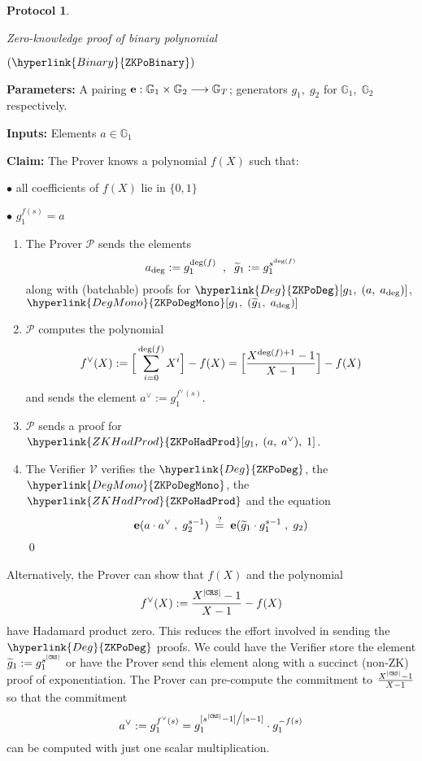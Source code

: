 \documentclass[11pt, lettersize, notitlepage, leqno, footskip=0.6cm]{article}
\newcommand{\lra}{\longrightarrow}
\newcommand{\wti}{\widetilde}
\newcommand{\mc}{\mathcal}
\newcommand{\mb}{\mathbb}
\newcommand{\mbf}{\mathbf}
\newcommand{\mP}{\mc{P}}
\newcommand{\V}{\mc{V}}
\newcommand{\vs}{\vspace{-0.15cm}}
\newcommand{\noin}{\noindent}
\newcommand{\sta}{\stackrel{?}{=}}
\newcommand{\e}{\mbf{e}}
\newtheorem{Prot}[Thm]{Protocol}
\numberwithin{equation}{section}
\begin{document}
\begin{mdframed}
\begin{Prot} \hypertarget{Binary}{Zero-knowledge proof of binary polynomial} $(\hyperlink{Binary}{\tt{ZKPoBinary}})$\end{Prot}  

\noindent \textbf{Parameters:} A pairing ${\bf{e}}:\mb{G}_1\times \mb{G}_2\lra \mb{G}_T$; generators $g_1,\;g_2$ for $\mb{G}_1,\; \mb{G}_2$ respectively.


\noindent \textbf{Inputs:} Elements $a\in \mb{G}_1$

\noindent \textbf{Claim:} The Prover knows a polynomial $f(X)$ such that:

\noin $\bullet$ all coefficients of $f(X)$ lie in $\{0,1\}$

\noin $\bullet$  $g_1^{f(s)} = a$

\begin{enumerate}[wide, labelwidth=!, labelindent=0pt, itemsep=-0.2ex] 

\item The Prover $\mP$ sends the elements \vs $$a_{\deg}:= g_1^{{\deg(f)}}\;\;,\;\; \wti{g}_1:= g_1^{s^{\deg(f)}}\vs $$ along with (batchable) proofs for $\hyperlink{Deg}{\tt{ZKPoDeg}}[g_1,\;(a,\;a_{\deg})]$, $\hyperlink{DegMono}{\tt{ZKPoDegMono}}[g_1,\;(\wti{g}_1,\;a_{\deg})]$

\item $\mP$ computes the polynomial \vs $$f^{\vee}(X):= \Big[\sum\limits_{i=0}^{\deg(f)} X^i\Big] - f(X) = \Big[\frac{X^{\deg(f)+1}-1}{X-1}\Big] - f(X)  \vs $$ and sends the element $a^{\vee}:= g_1^{f^{\vee}(s)}$.

\item $\mP$ sends a proof for $\hyperlink{ZKHadProd}{\tt{ZKPoHadProd}}[g_1,\;(a,\;a^{\vee}),\;1]$.

\item The Verifier $\V$ verifies the $\hyperlink{Deg}{\tt{ZKPoDeg}}$, the $\hyperlink{DegMono}{\tt{ZKPoDegMono}}$, the $\hyperlink{ZKHadProd}{\tt{ZKPoHadProd}}$ and the equation \vs $$ \e(a\cdot a^{\vee}\;,\;g_2^{s-1})\; \sta\; \e(\wti{g}_1\cdot g_1^{s-1}\;,\;g_2)   \vs $$ \qed

\end{enumerate}

\end{mdframed}


Alternatively, the Prover can show that $f(X)$ and the polynomial \vs $$f^{\vee}(X):=  \frac{X^{|\tt{CRS}|}-1}{X-1} - f(X) $$ have Hadamard product zero. This reduces the effort involved in sending the $\hyperlink{Deg}{\tt{ZKPoDeg}}$ proofs. We could have the Verifier store the element $\wti{g}_1:= g_1^{s^{|{\tt{CRS}}|}}$ or have the Prover send this element along with a succinct (non-ZK) proof of exponentiation. The Prover can pre-compute the commitment to $\frac{X^{|\tt{CRS}|}-1}{X-1}$ so that the commitment \vs $$ a^{\vee}:= g_1^{f^{\vee}(s)} = g_1^{[s^{|\tt{CRS}|}-1]\big/[s-1]} \cdot g_1^{-f(s)} $$ can be computed with just one scalar multiplication.
\end{document}
